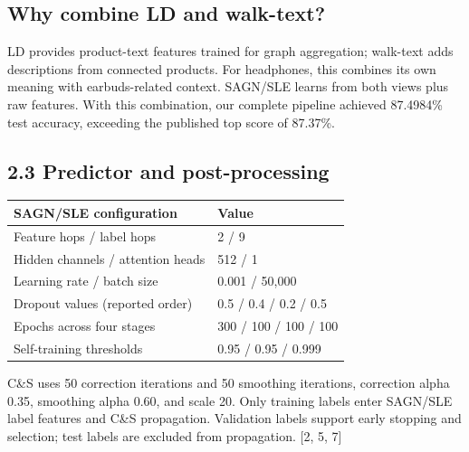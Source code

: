 \documentclass[10pt]{article}
\begin{document}
\subsection*{Why combine LD and walk-text?}

LD provides product-text features trained for graph aggregation; walk-text adds descriptions from connected products. For headphones, this combines its own meaning with earbuds-related context. SAGN/SLE learns from both views plus raw features. With this combination, our complete pipeline achieved 87.4984\% test accuracy, exceeding the published top score of 87.37\%.\par

\newpage

\subsection*{2.3 Predictor and post-processing}

\begin{longtable}{@{}p{3.491in}p{3.269in}@{}}

\toprule

SAGN/SLE configuration & Value \\

\midrule

Feature hops / label hops & 2 / 9 \\

Hidden channels / attention heads & 512 / 1 \\

Learning rate / batch size & 0.001 / 50,000 \\

Dropout values (reported order) & 0.5 / 0.4 / 0.2 / 0.5 \\

Epochs across four stages & 300 / 100 / 100 / 100 \\

Self-training thresholds & 0.95 / 0.95 / 0.999 \\

\bottomrule\end{longtable}

{\small C\&S uses 50 correction iterations and 50 smoothing iterations, correction alpha 0.35, smoothing alpha 0.60, and scale 20. Only training labels enter SAGN/SLE label features and C\&S propagation. Validation labels support early stopping and selection; test labels are excluded from propagation. [2, 5, 7]\par}
\end{document}
